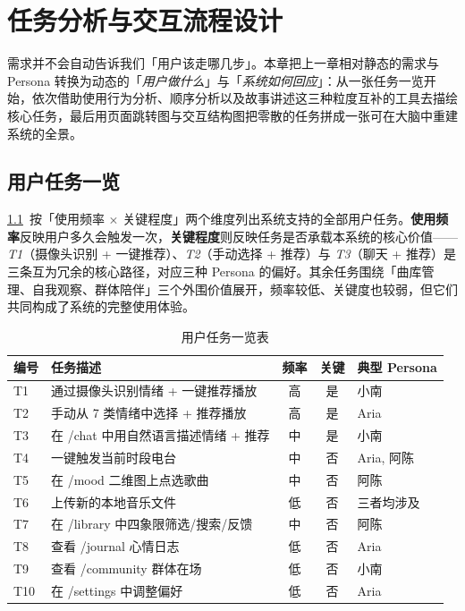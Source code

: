 \chapter{任务分析与交互流程设计}\label{chap:task-flow}

需求并不会自动告诉我们「用户该走哪几步」。本章把上一章相对静态的需求与 Persona 转换为动态的「\emph{用户做什么}」与「\emph{系统如何回应}」：从一张任务一览开始，依次借助使用行为分析、顺序分析以及故事讲述这三种粒度互补的工具去描绘核心任务，最后用页面跳转图与交互结构图把零散的任务拼成一张可在大脑中重建系统的全景。

\section{用户任务一览}

\cref{tab:task-list}~按「使用频率 $\times$ 关键程度」两个维度列出系统支持的全部用户任务。\textbf{使用频率}反映用户多久会触发一次，\textbf{关键程度}则反映任务是否承载本系统的核心价值——\emph{T1}（摄像头识别 + 一键推荐）、\emph{T2}（手动选择 + 推荐）与 \emph{T3}（聊天 + 推荐）是三条互为冗余的核心路径，对应三种 Persona 的偏好。其余任务围绕「曲库管理、自我观察、群体陪伴」三个外围价值展开，频率较低、关键度也较弱，但它们共同构成了系统的完整使用体验。

\begin{table}[!htb]
  \centering
  \caption{用户任务一览表}\label{tab:task-list}
  \begin{tabularx}{\linewidth}{>{\ttfamily}lXccl}
    \toprule
    \textbf{编号} & \textbf{任务描述} & \textbf{频率} & \textbf{关键} & \textbf{典型 Persona} \\
    \midrule
    T1 & 通过摄像头识别情绪 + 一键推荐播放 & 高 & 是 & 小南 \\
    T2 & 手动从 7 类情绪中选择 + 推荐播放 & 高 & 是 & Aria \\
    T3 & 在 /chat 中用自然语言描述情绪 + 推荐 & 中 & 是 & 小南 \\
    T4 & 一键触发当前时段电台         & 中 & 否 & Aria, 阿陈 \\
    T5 & 在 /mood 二维图上点选歌曲    & 中 & 否 & 阿陈 \\
    T6 & 上传新的本地音乐文件         & 低 & 否 & 三者均涉及 \\
    T7 & 在 /library 中四象限筛选/搜索/反馈 & 中 & 否 & 阿陈 \\
    T8 & 查看 /journal 心情日志       & 低 & 否 & Aria \\
    T9 & 查看 /community 群体在场     & 低 & 否 & 小南 \\
    T10 & 在 /settings 中调整偏好     & 低 & 否 & Aria \\
    \bottomrule
  \end{tabularx}
\end{table}

